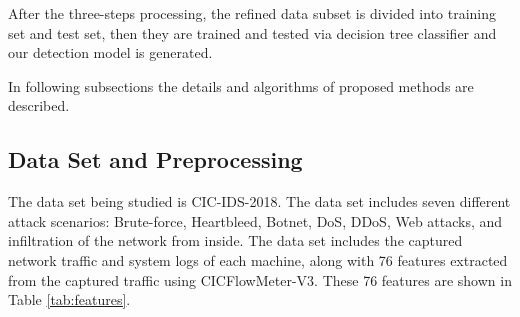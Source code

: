 \documentclass[journal]{IEEEtran}
\begin{document}
After the three-steps processing, the refined data subset is divided into training set and test set, then they are trained and tested via decision tree classifier and our detection model is generated.

In following subsections the details and algorithms of proposed methods are described.

\subsection{Data Set and Preprocessing}

The data set being studied is CIC-IDS-2018\cite{cic2018}. The data set includes seven different attack scenarios: Brute-force, Heartbleed, Botnet, DoS, DDoS, Web attacks, and infiltration of the network from inside. The data set includes the captured network traffic and system logs of each machine, along with 76 features extracted from the captured traffic using CICFlowMeter-V3\cite{cicflowmeter}. These 76 features are shown in Table \ref{tab:features}.
\end{document}
